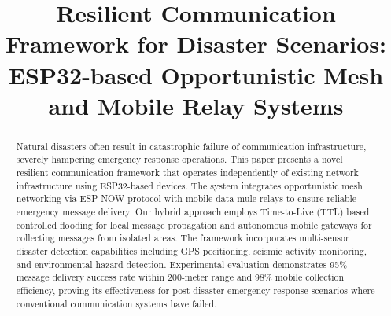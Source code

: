 \documentclass[conference]{IEEEtran}
\begin{document}
\title{Resilient Communication Framework for Disaster Scenarios: ESP32-based Opportunistic Mesh and Mobile Relay Systems}

\author{
  \and
  \and
  \and
}

\maketitle

\begin{abstract}
Natural disasters often result in catastrophic failure of communication infrastructure, severely hampering emergency response operations. This paper presents a novel resilient communication framework that operates independently of existing network infrastructure using ESP32-based devices. The system integrates opportunistic mesh networking via ESP-NOW protocol with mobile data mule relays to ensure reliable emergency message delivery. Our hybrid approach employs Time-to-Live (TTL) based controlled flooding for local message propagation and autonomous mobile gateways for collecting messages from isolated areas. The framework incorporates multi-sensor disaster detection capabilities including GPS positioning, seismic activity monitoring, and environmental hazard detection. Experimental evaluation demonstrates 95\% message delivery success rate within 200-meter range and 98\% mobile collection efficiency, proving its effectiveness for post-disaster emergency response scenarios where conventional communication systems have failed.
\end{abstract}
\end{document}
